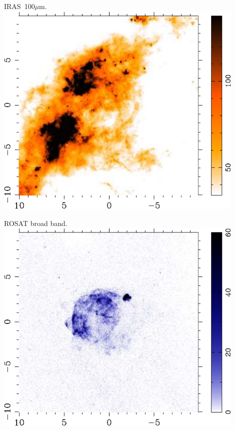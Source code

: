 \begin{minipage}[t]{13cm}
  \begin{center}
IRAS~100$\mu$m.
    \includegraphics[width=12cm,height=!]{./E/VelaX_100um.pdf}
    \end{center}
\end{minipage}
\begin{minipage}[t]{13cm}
  \begin{center}
ROSAT broad band.
    \includegraphics[width=12cm,height=!]{./E/VelaX_RASS_broad.pdf}
    \end{center}
\end{minipage}


